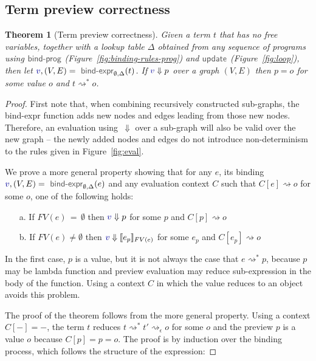\documentclass[acmsmall,anonymous,fleqn]{acmart}\settopmatter{printfolios=false,printccs=false,printacmref=false}
\newcounter{thc}
\theoremstyle{plain}
\newtheorem{theorem}[thc]{Theorem}
\theoremstyle{definition}
\newcommand{\ident}[1]{\textnormal{\textcolor{idclr}{\sffamily #1}}}
\newcommand{\bndclr}[1]{\textcolor{kvdclr}{#1}}
\begin{document}
\subsection{Term preview correctness}
\label{sec:app-correctness}

\begin{theorem}[Term preview correctness]
Given a term $t$ that has no free variables, together with a lookup table $\Delta$ obtained
from any sequence of programs using $\ident{bind-prog}$ (Figure~\ref{fig:binding-rules-prog}) and
$\ident{update}$ (Figure~\ref{fig:loop}), then
let $\bndclr{v}, (V, E) = \ident{bind-expr}_{\emptyset, \Delta}(t)$. If $\bndclr{v}\Downarrow p$
over a graph $(V, E)$ then $p = o$ for some value $o$ and $t \rightsquigarrow^{*} o$.
\end{theorem}

\begin{proof}
First note that, when combining recursively constructed sub-graphs, the \ident{bind-expr} function
adds new nodes and edges leading from those new nodes. Therefore, an evaluation using~$\Downarrow$
over a sub-graph will also be valid over the new graph -- the newly added nodes and edges do not introduce
non-determinism to the rules given in Figure~\ref{fig:eval}.

We prove a more general property showing that for any $e$, its binding
$\bndclr{v}, (V, E) = \ident{bind-expr}_{\emptyset, \Delta}(e)$ and any evaluation context $C$
such that $C[e]\rightsquigarrow o$ for some $o$, one of the following holds:
%
\begin{enumerate}
\item[a.] If $FV(e)\,=\,\emptyset$ then $\bndclr{v} \Downarrow p$ for some $p$ and $C[p] \rightsquigarrow o$
\item[b.] If $FV(e)\neq\emptyset$ then $\bndclr{v} \Downarrow \llbracket e_p \rrbracket_{FV(e)}$ for some $e_p$ and $C[e_p] \rightsquigarrow o$
\end{enumerate}
%
In the first case, $p$ is a value, but it is not always the case that $e \rightsquigarrow^{*} p$,
because $p$ may be lambda function and preview evaluation may reduce sub-expression in the body of
the function. Using a context $C$ in which the value reduces to an object avoids this problem.

The proof of the theorem follows from the more general property. Using a context $C[-]=-$, the
term $t$ reduces $t \rightsquigarrow^{*}t' \rightsquigarrow_\epsilon o$ for some $o$ and the
preview $p$ is a value $o$ because $C[p] = p = o$.
The proof is by induction over the binding process, which follows the structure of the expression:


\end{proof}
\end{document}
